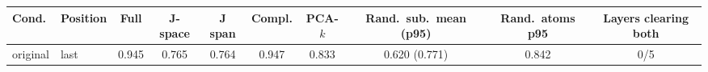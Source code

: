 \begin{tabular}{llcccccccc}\toprule
Cond. & Position & Full & J-space & J span & Compl. & PCA-$k$ & Rand.\ sub.\ mean (p95) & Rand.\ atoms p95 & Layers clearing both\\\midrule
original & last & 0.945 & 0.765 & 0.764 & 0.947 & 0.833 & 0.620 (0.771) & 0.842 & 0/5\\
\midrule
\bottomrule\end{tabular}
